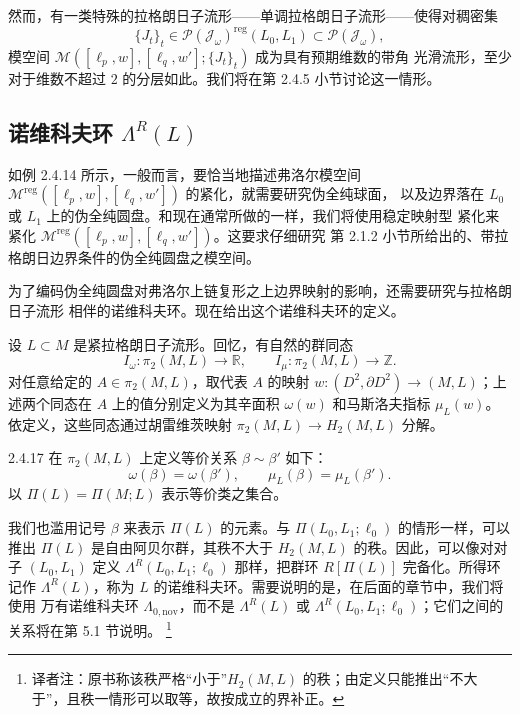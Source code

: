 然而，有一类特殊的拉格朗日子流形——单调拉格朗日子流形——使得对稠密集
\[
  \{J_t\}_t\in
  \mathcal P(\mathcal J_\omega)^{\mathrm{reg}}(L_0,L_1)
  \subset\mathcal P(\mathcal J_\omega),
\]
模空间 $\mathcal M([\ell_p,w],[\ell_q,w'];\{J_t\}_t)$ 成为具有预期维数的带角
光滑流形，至少对于维数不超过 $2$ 的分层如此。我们将在第 2.4.5 小节讨论这一情形。

\subsection{诺维科夫环 \texorpdfstring{$\Lambda^R(L)$}{Lambda R(L)}}
\label{sec:2-4-3}

如例 2.4.14 所示，一般而言，要恰当地描述弗洛尔模空间
$\mathcal M^{\mathrm{reg}}([\ell_p,w],[\ell_q,w'])$ 的紧化，就需要研究伪全纯球面，
以及边界落在 $L_0$ 或 $L_1$ 上的伪全纯圆盘。和现在通常所做的一样，我们将使用稳定映射型
紧化来紧化 $\mathcal M^{\mathrm{reg}}([\ell_p,w],[\ell_q,w'])$。这要求仔细研究
第 2.1.2 小节所给出的、带拉格朗日边界条件的伪全纯圆盘之模空间。

为了编码伪全纯圆盘对弗洛尔上链复形之上边界映射的影响，还需要研究与拉格朗日子流形
相伴的诺维科夫环。现在给出这个诺维科夫环的定义。

设 $L\subset M$ 是紧拉格朗日子流形。回忆，有自然的群同态
\[
  I_\omega:\pi_2(M,L)\longrightarrow\mathbb R,
  \qquad
  I_\mu:\pi_2(M,L)\longrightarrow\mathbb Z.
\]
对任意给定的 $A\in\pi_2(M,L)$，取代表 $A$ 的映射
$w:(D^2,\partial D^2)\to(M,L)$；上述两个同态在 $A$ 上的值分别定义为其辛面积
$\omega(w)$ 和马斯洛夫指标 $\mu_L(w)$。依定义，这些同态通过胡雷维茨映射
$\pi_2(M,L)\to H_2(M,L)$ 分解。

\begin{definition}{2.4.17}\label{def:2-4-17}
在 $\pi_2(M,L)$ 上定义等价关系 $\beta\sim\beta'$ 如下：
\[
  \omega(\beta)=\omega(\beta'),
  \qquad
  \mu_L(\beta)=\mu_L(\beta').
\]
以 $\Pi(L)=\Pi(M;L)$ 表示等价类之集合。
\end{definition}

我们也滥用记号 $\beta$ 来表示 $\Pi(L)$ 的元素。与
$\Pi(L_0,L_1;\ell_0)$ 的情形一样，可以推出 $\Pi(L)$ 是自由阿贝尔群，其秩不大于
$H_2(M,L)$ 的秩。因此，可以像对对子 $(L_0,L_1)$ 定义
$\Lambda^R(L_0,L_1;\ell_0)$ 那样，把群环 $R[\Pi(L)]$ 完备化。所得环记作
$\Lambda^R(L)$，称为 $L$ 的诺维科夫环。需要说明的是，在后面的章节中，我们将使用
万有诺维科夫环 $\Lambda_{0,\mathrm{nov}}$，而不是 $\Lambda^R(L)$ 或
$\Lambda^R(L_0,L_1;\ell_0)$；它们之间的关系将在第 5.1 节说明。
\footnote{译者注：原书称该秩严格“小于”$H_2(M,L)$ 的秩；由定义只能推出“不大于”，且秩一情形可以取等，故按成立的界补正。}

